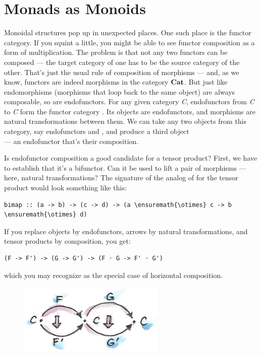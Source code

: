 \section{Monads as Monoids}\label{monads-as-monoids}

Monoidal structures pop up in unexpected places. One such place is the
functor category. If you squint a little, you might be able to see
functor composition as a form of multiplication. The problem is that not
any two functors can be composed --- the target category of one has to
be the source category of the other. That's just the usual rule of
composition of morphisms --- and, as we know, functors are indeed
morphisms in the category $\mathbf{Cat}$. But just like endomorphisms
(morphisms that loop back to the same object) are always composable, so
are endofunctors. For any given category \emph{C}, endofunctors from
\emph{C} to \emph{C} form the functor category \code{{[}C, C{]}}. Its
objects are endofunctors, and morphisms are natural transformations
between them. We can take any two objects from this category, say
endofunctors  and , and produce a third object\\
 --- an endofunctor that's their composition.

Is endofunctor composition a good candidate for a tensor product? First,
we have to establish that it's a bifunctor. Can it be used to lift a
pair of morphisms --- here, natural transformations? The signature of
the analog of  for the tensor product would look something
like this:

\begin{Verbatim}[commandchars=\\\{\}]
bimap :: (a -> b) -> (c -> d) -> (a \ensuremath{\otimes} c -> b \ensuremath{\otimes} d)
\end{Verbatim}
If you replace objects by endofunctors, arrows by natural
transformations, and tensor products by composition, you get:

\begin{Verbatim}[commandchars=\\\{\}]
(F -> F') -> (G -> G') -> (F ◦ G -> F' ◦ G')
\end{Verbatim}
which you may recognize as the special case of horizontal composition.

\begin{figure}[H]
\centering
\includegraphics[width=70mm]{images/horizcomp.png}
\end{figure}

